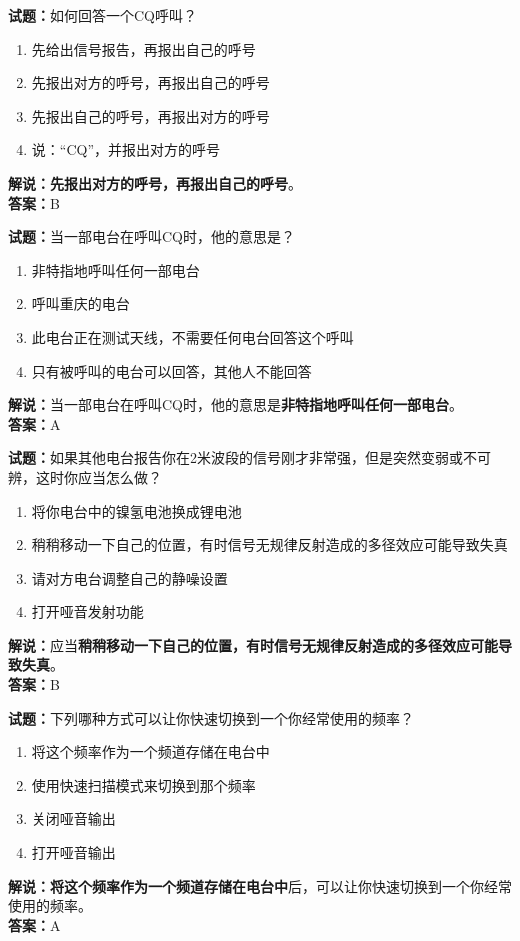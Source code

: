 \documentclass{ctexbook}
\begin{document}
\vspace{\baselineskip}

\noindent\textbf{试题：}如何回答一个CQ呼叫？
\begin{enumerate}[leftmargin=3em]
  \item 先给出信号报告，再报出自己的呼号
  \item 先报出对方的呼号，再报出自己的呼号
  \item 先报出自己的呼号，再报出对方的呼号
  \item 说：“CQ”，并报出对方的呼号
\end{enumerate}
\noindent\textbf{解说：}\textbf{先报出对方的呼号，再报出自己的呼号}。\\\noindent\textbf{答案：}B

\vspace{\baselineskip}

\noindent\textbf{试题：}当一部电台在呼叫CQ时，他的意思是？
\begin{enumerate}[leftmargin=3em]
  \item 非特指地呼叫任何一部电台
  \item 呼叫重庆的电台
  \item 此电台正在测试天线，不需要任何电台回答这个呼叫
  \item 只有被呼叫的电台可以回答，其他人不能回答
\end{enumerate}
\noindent\textbf{解说：}当一部电台在呼叫CQ时，他的意思是\textbf{非特指地呼叫任何一部电台}。\\\noindent\textbf{答案：}A

\vspace{\baselineskip}

\noindent\textbf{试题：}如果其他电台报告你在2米波段的信号刚才非常强，但是突然变弱或不可辨，这时你应当怎么做？
\begin{enumerate}[leftmargin=3em]
  \item 将你电台中的镍氢电池换成锂电池
  \item 稍稍移动一下自己的位置，有时信号无规律反射造成的多径效应可能导致失真
  \item 请对方电台调整自己的静噪设置
  \item 打开哑音发射功能
\end{enumerate}
\noindent\textbf{解说：}应当\textbf{稍稍移动一下自己的位置，有时信号无规律反射造成的多径效应可能导致失真}。\\\noindent\textbf{答案：}B

\vspace{\baselineskip}

\noindent\textbf{试题：}下列哪种方式可以让你快速切换到一个你经常使用的频率？
\begin{enumerate}[leftmargin=3em]
  \item 将这个频率作为一个频道存储在电台中
  \item 使用快速扫描模式来切换到那个频率
  \item 关闭哑音输出
  \item 打开哑音输出
\end{enumerate}
\noindent\textbf{解说：}\textbf{将这个频率作为一个频道存储在电台中}后，可以让你快速切换到一个你经常使用的频率。\\\noindent\textbf{答案：}A
\end{document}
